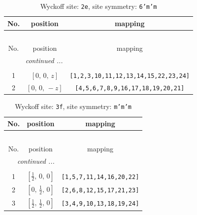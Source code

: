 \documentclass[fleqn,8pt]{jsarticle}
\begin{document}
\begin{longtable}{ccc}
\caption{Wyckoff site: {\tt 2e}, site symmetry: {\tt 6'm'm}}
 \\
 \hline \hline
No. & position & mapping \\ \hline \endfirsthead

\multicolumn{2}{l}{\tablename\ \thetable{}} \\
 \hline \hline
No. & position & mapping \\ \hline \endhead

 \hline \hline
\multicolumn{2}{r}{\footnotesize\it continued ...} \\ \endfoot

 \hline \hline
\multicolumn{2}{r}{} \\ \endlastfoot

1 & $\left[ 0,\, 0,\, z \right]$ & {\tt [1,2,3,10,11,12,13,14,15,22,23,24]} \\ \hline
2 & $\left[ 0,\, 0,\, - z \right]$ & {\tt [4,5,6,7,8,9,16,17,18,19,20,21]} \\
\end{longtable}
\renewcommand{\arraystretch}{1.2}
\begin{longtable}{ccc}
\caption{Wyckoff site: {\tt 3f}, site symmetry: {\tt m'm'm}}
 \\
 \hline \hline
No. & position & mapping \\ \hline \endfirsthead

\multicolumn{2}{l}{\tablename\ \thetable{}} \\
 \hline \hline
No. & position & mapping \\ \hline \endhead

 \hline \hline
\multicolumn{2}{r}{\footnotesize\it continued ...} \\ \endfoot

 \hline \hline
\multicolumn{2}{r}{} \\ \endlastfoot

1 & $\left[ \frac{1}{2},\, 0,\, 0 \right]$ & {\tt [1,5,7,11,14,16,20,22]} \\ \hline
2 & $\left[ 0,\, \frac{1}{2},\, 0 \right]$ & {\tt [2,6,8,12,15,17,21,23]} \\ \hline
3 & $\left[ \frac{1}{2},\, \frac{1}{2},\, 0 \right]$ & {\tt [3,4,9,10,13,18,19,24]} \\
\end{longtable}
\renewcommand{\arraystretch}{1.2}
\end{document}
